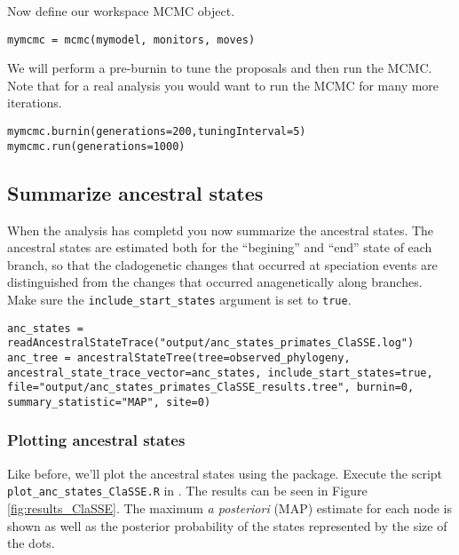 Now define our workspace MCMC object.
{\tt \begin{snugshade*}
\begin{lstlisting}
mymcmc = mcmc(mymodel, monitors, moves)
\end{lstlisting}
\end{snugshade*}}

We will perform a pre-burnin to tune the proposals
and then run the MCMC. Note that for a real analysis you would
want to run the MCMC for many more iterations.
{\tt \begin{snugshade*}
\begin{lstlisting}
mymcmc.burnin(generations=200,tuningInterval=5)
mymcmc.run(generations=1000)
\end{lstlisting}
\end{snugshade*}}

\subsection{Summarize ancestral states}

When the analysis has completd you now summarize the ancestral states. 
The ancestral states are estimated both for the ``begining'' and ``end''
state of each branch, so that the cladogenetic changes that occurred at speciation events
are distinguished from the changes that occurred anagenetically along branches.
Make sure the \texttt{include\_start\_states} argument is set to \texttt{true}.
{\tt \begin{snugshade*}
\begin{lstlisting}
anc_states = readAncestralStateTrace("output/anc_states_primates_ClaSSE.log")
anc_tree = ancestralStateTree(tree=observed_phylogeny, ancestral_state_trace_vector=anc_states, include_start_states=true, file="output/anc_states_primates_ClaSSE_results.tree", burnin=0, summary_statistic="MAP", site=0)
\end{lstlisting}
\end{snugshade*}}

\subsubsection{Plotting ancestral states}

Like before, we'll plot the ancestral states 
using the \RevGadgets \R package.
Execute the script \texttt{plot\_anc\_states\_ClaSSE.R} in \R.
The results can be seen in Figure \ref{fig:results_ClaSSE}.
The maximum \emph{a posteriori} (MAP) estimate for each node is shown as well as the posterior probability of the states represented by the size of the dots.

